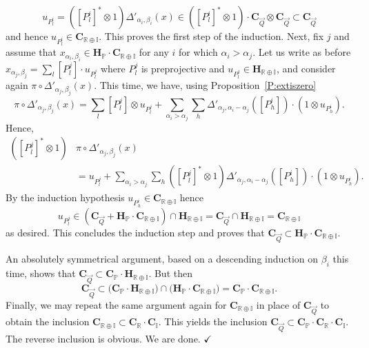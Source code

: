 \documentclass[a4paper,10pt]{amsart}
\def\H{\mathbf{H}}
\def\qed{$\hfill \checkmark$}
\def\a{\alpha}
\numberwithin{equation}{section}
\begin{document}
$$u_{P_l^i}= ([P_l^i]^* \otimes 1) \Delta'_{\a_i,\beta_i}(x) \in ([P_l^i]^*\otimes 1) \cdot \mathbf{C}_{\vec{Q}} \otimes \mathbf{C}_{\vec{Q}}\subset\mathbf{C}_{\vec{Q}}$$
and hence $u_{P_l^i} \in \mathbf{C}_{\mathbb{R}\oplus \mathbb{I}}$. This proves the first step of the induction. Next, fix $j$ and assume that $x_{\a_i,\beta_i} \in \H_{\mathbb{P}} \cdot \mathbf{C}_{\mathbb{R}\oplus \mathbb{I}}$ for any $i$ for which $\a_i > \a_j$. Let us write as before
$x_{\a_j,\beta_j}=\sum_l [P_l^j] \cdot u_{P_l^j}$ where $P_l^j$ is preprojective and $u_{P_l^j} \in \H_{\mathbb{R}\oplus \mathbb{I}}$, and consider again $\pi \circ \Delta'_{\a_j,\beta_j}(x)$. This time, we have, using Proposition~\ref{P:extiszero}
$$\pi \circ \Delta'_{\a_j,\beta_j}(x)=\sum_l [P^j_l] \otimes u_{P^j_l} +\sum_{\a_i > \a_j} \sum_h \Delta'_{\a_j,\a_i-\a_j}([P_h^i]) \cdot (1 \otimes u_{P^i_h}).$$
Hence,
\begin{equation*}
\begin{split}
([P_l^j]^* \otimes 1)&\pi \circ \Delta'_{\a_j,\beta_j}(x)\\
&= u_{P^j_l}+\sum_{\a_i > \a_j} \sum_h ([P_l^j]^* \otimes 1)\Delta'_{\a_j,\a_i-\a_j}([P_h^i]) \cdot (1 \otimes u_{P^i_h}).
\end{split}
\end{equation*}
By the induction hypothesis $u_{P^i_h} \in \mathbf{C}_{\mathbb{R} \oplus \mathbb{I}}$ hence
$$u_{P_l^j} \in (\mathbf{C}_{\vec{Q}} + \H_{\mathbb{P}} \cdot \mathbf{C}_{\mathbb{R}\oplus \mathbb{I}}) \cap \H_{\mathbb{R} \oplus \mathbb{I}}=\mathbf{C}_{\vec{Q}} \cap \H_{\mathbb{R}\oplus \mathbb{I}}=\mathbf{C}_{\mathbb{R}\oplus \mathbb{I}}$$
as desired. This concludes the induction step and proves that $\mathbf{C}_{\vec{Q}} \subset \H_{\mathbb{P}} \cdot \mathbf{C}_{\mathbb{R}\oplus \mathbb{I}}$.

An absolutely symmetrical argument, based on a descending induction on $\beta_i$ this time, shows that
$\mathbf{C}_{\vec{Q}} \subset \mathbf{C}_{\mathbb{P}} \cdot \mathbf{H}_{\mathbb{R}\oplus \mathbb{I}}$.
But then
$$\mathbf{C}_{\vec{Q}} \subset \big(\mathbf{C}_{\mathbb{P}} \cdot \mathbf{H}_{\mathbb{R}\oplus \mathbb{I}}\big) \cap \big(\H_{\mathbb{P}} \cdot \mathbf{C}_{\mathbb{R}\oplus \mathbb{I}}\big)=\mathbf{C}_{\mathbb{P}} \cdot \mathbf{C}_{\mathbb{R}\oplus \mathbb{I}}.$$
Finally, we may repeat the same argument again for $\mathbf{C}_{\mathbb{R}\oplus \mathbb{I}}$ in place of $\mathbf{C}_{\vec{Q}}$ to obtain the inclusion $\mathbf{C}_{\mathbb{R}\oplus\mathbb{I}}\subset \mathbf{C}_{\mathbb{R}} \cdot \mathbf{C}_{\mathbb{I}}$. This yields the inclusion $\mathbf{C}_{\vec{Q}} \subset \mathbf{C}_{\mathbb{P}} \cdot \mathbf{C}_{\mathbb{R}} \cdot \mathbf{C}_{\mathbb{I}}$. The reverse inclusion is obvious. We are done. \qed
\end{document}
